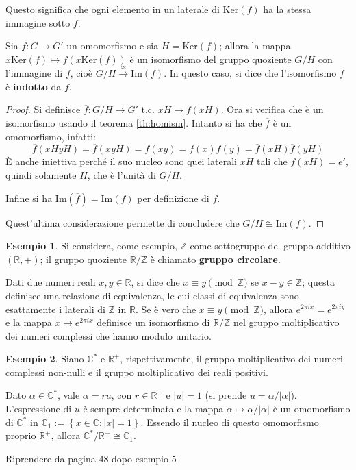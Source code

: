 \documentclass[11pt, a4paper]{scrartcl}
\theoremstyle{definition}
\newtheorem{esempio}{Esempio}
\numberwithin{esempio}{section}
\theoremstyle{definition}
\numberwithin{obs}{section}
\numberwithin{nota}{section}
\numberwithin{equation}{subsection}
\begin{document}
Questo significa che ogni elemento in un laterale di $\mathrm{Ker} (f)$ ha la stessa immagine sotto $f$.
\begin{corollario}
	{}{}
	Sia $f:G\to G'$ un omomorfismo e sia $H= \mathrm{Ker} (f)$; allora la mappa $x \mathrm{Ker} (f) \mapsto f(x \mathrm{Ker} (f))$ \`e un isomorfismo del gruppo quoziente $G / H$ con l'immagine di $f$, cio\`e $G/H \stackrel{\approx}{\longrightarrow}\mathrm{Im} (f)$.
In questo caso, si dice che l'isomorfismo $\overline{f}$ \`e \textbf{indotto} da $f$.
	\begin{proof}
		Si definisce $\overline{f}: G / H \to G' $ t.c. $ xH \mapsto f(xH)$. Ora si verifica che \`e un isomorfismo usando il teorema \ref{th:homism}. Intanto si ha che $\overline{f}$ \`e un omomorfismo, infatti:
		\[
		\overline{f}(xHyH) = \overline{f}(xyH) = f(xy) = f(x)f(y) = \overline{f}(xH) \overline{f}(yH)
		\] 
\`E anche iniettiva perch\'e il suo nucleo sono quei laterali $xH$ tali che $f(xH) = e'$, quindi solamente $H$, che \`e l'unit\`a di $G / H$.

Infine si ha $\mathrm{Im} (\overline{f}) = \mathrm{Im} (f)$ per definizione di $f$.

Quest'ultima considerazione permette di concludere che $G / H \cong \mathrm{Im} (f)$.
	\end{proof}
\end{corollario}
\begin{esempio}
Si considera, come esempio, $\mathbb{Z}$ come sottogruppo del gruppo additivo $(\mathbb{R}, + )$; il gruppo quoziente $\mathbb{R} / \mathbb{Z}$ \`e chiamato \textbf{gruppo circolare}. 

Dati due numeri reali $x,y \in \mathbb{R}$, si dice che $x \equiv y \pmod{\mathbb{Z}}$ se $x - y \in \mathbb{Z}$; questa definisce una relazione di equivalenza, le cui classi di equivalenza sono esattamente i laterali di $\mathbb{Z}$ in $\mathbb{R}$. 
Se \`e vero che $x \equiv y \pmod{\mathbb{Z}}$, allora $e^{2\pi i x} = e^{2\pi i y} $ e la mappa $x \mapsto e^{2\pi i x} $ definisce un isomorfismo di $\mathbb{R} / \mathbb{Z}$ nel gruppo moltiplicativo dei numeri complessi che hanno modulo unitario.
\end{esempio}
\begin{esempio}
Siano $\mathbb{C}^*$ e $\mathbb{R}^+$, rispettivamente, il gruppo moltiplicativo dei numeri complessi non-nulli e il gruppo moltiplicativo dei reali positivi.

Dato $\alpha \in \mathbb{C}^*$, vale $\alpha  = ru$, con $r \in \mathbb{R}^+$ e $\lvert u \rvert = 1$ (si prende $u = \alpha  / \lvert \alpha  \rvert $). 
L'espressione di $u$ \`e sempre determinata e la mappa $\alpha \mapsto \alpha / \lvert \alpha  \rvert $ \`e un omomorfismo di $\mathbb{C}^*$ in $\mathbb{C}_1 := \left\{ x \in \mathbb{C} : \lvert x \rvert = 1 \right\} $.
Essendo il nucleo di questo omomorfismo proprio $\mathbb{R}^+$, allora $\mathbb{C}^* / \mathbb{R}^+ \cong \mathbb{C}_1$.
\end{esempio}
\begin{center}
	\color{asdf}Riprendere da pagina 48 dopo esempio 5
\end{center}
\end{document}

